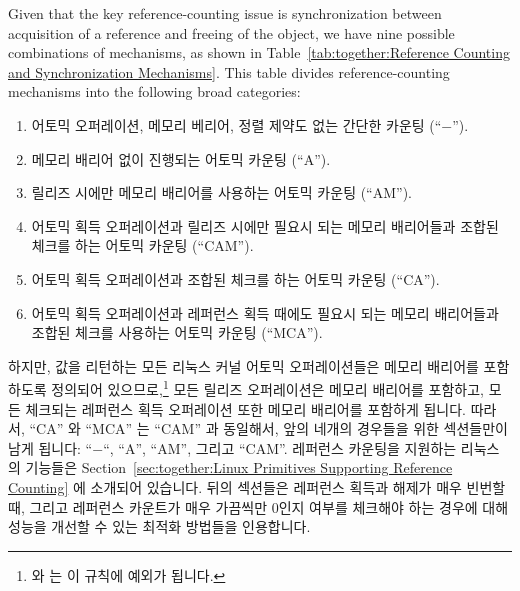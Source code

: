 Given that the key reference-counting issue
is synchronization between acquisition
of a reference and freeing of the object, we have nine possible
combinations of mechanisms, as shown in
Table~\ref{tab:together:Reference Counting and Synchronization Mechanisms}.
This table
divides reference-counting mechanisms into the following broad categories:
\fi
\begin{enumerate}
\item	어토믹 오퍼레이션, 메모리 베리어, 정렬 제약도 없는 간단한 카운팅
	(``$-$'').
\item	메모리 배리어 없이 진행되는 어토믹 카운팅 (``A'').
\item	릴리즈 시에만 메모리 배리어를 사용하는 어토믹 카운팅 (``AM'').
\item	어토믹 획득 오퍼레이션과 릴리즈 시에만 필요시 되는 메모리 배리어들과
	조합된 체크를 하는 어토믹 카운팅 (``CAM'').
\item	어토믹 획득 오퍼레이션과 조합된 체크를 하는 어토믹 카운팅 (``CA'').
\item	어토믹 획득 오퍼레이션과 레퍼런스 획득 때에도 필요시 되는 메모리
	배리어들과 조합된 체크를 사용하는 어토믹 카운팅 (``MCA'').
\iffalse

\item	Simple counting with neither atomic operations, memory
	barriers, nor alignment constraints (``$-$'').
\item	Atomic counting without memory barriers (``A'').
\item	Atomic counting, with memory barriers required only on release
	(``AM'').
\item	Atomic counting with a check combined with the atomic acquisition
	operation, and with memory barriers required only on release
	(``CAM'').
\item	Atomic counting with a check combined with the atomic acquisition
	operation (``CA'').
\item	Atomic counting with a check combined with the atomic acquisition
	operation, and with memory barriers also required on acquisition
	(``MCA'').
\fi
\end{enumerate}
하지만, 값을 리턴하는 모든 리눅스 커널 어토믹 오퍼레이션들은 메모리 배리어를
포함하도록 정의되어 있으므로,\footnote{
	 와  는 이 규칙에 예외가 됩니다.}
모든 릴리즈 오퍼레이션은 메모리 배리어를 포함하고, 모든 체크되는 레퍼런스
획득 오퍼레이션 또한 메모리 배리어를 포함하게 됩니다.
따라서, ``CA'' 와 ``MCA'' 는 ``CAM'' 과 동일해서, 앞의 네개의 경우들을 위한
섹션들만이 남게 됩니다:
``$-$``, ``A'', ``AM'', 그리고 ``CAM''.
레퍼런스 카운팅을 지원하는 리눅스의 기능들은
Section~\ref{sec:together:Linux Primitives Supporting Reference Counting} 에
소개되어 있습니다.
뒤의 섹션들은 레퍼런스 획득과 해제가 매우 빈번할 때, 그리고 레퍼런스 카운트가
매우 가끔씩만 0인지 여부를 체크해야 하는 경우에 대해 성능을 개선할 수 있는
최적화 방법들을 인용합니다.
\iffalse

